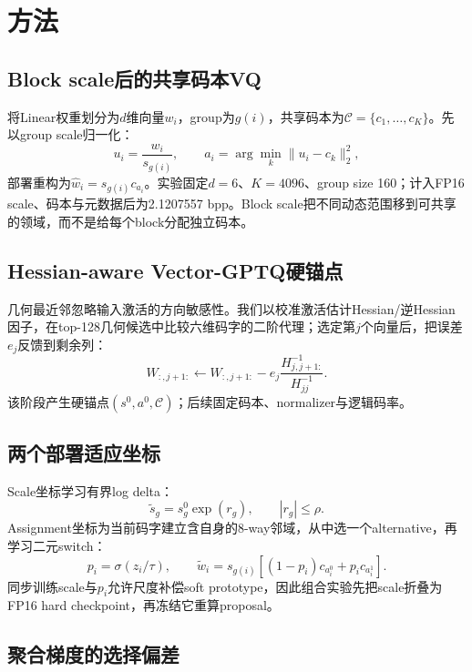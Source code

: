 \section{方法}

\subsection{Block scale后的共享码本VQ}

将Linear权重划分为$d$维向量$w_i$，group为$g(i)$，共享码本为$\mathcal C=\{c_1,\ldots,c_K\}$。先以group scale归一化：
\begin{equation}
u_i=\frac{w_i}{s_{g(i)}},\qquad a_i=\arg\min_k\|u_i-c_k\|_2^2,
\end{equation}
部署重构为$\hat w_i=s_{g(i)}c_{a_i}$。实验固定$d=6$、$K=4096$、group size 160；计入FP16 scale、码本与元数据后为2.1207557 bpp。Block scale把不同动态范围移到可共享的领域，而不是给每个block分配独立码本。

\subsection{Hessian-aware Vector-GPTQ硬锚点}

几何最近邻忽略输入激活的方向敏感性。我们以校准激活估计Hessian/逆Hessian因子，在top-128几何候选中比较六维码字的二阶代理；选定第$j$个向量后，把误差$e_j$反馈到剩余列：
\begin{equation}
W_{:,j+1:}\leftarrow W_{:,j+1:}-e_j\frac{H^{-1}_{j,j+1:}}{H^{-1}_{jj}}.
\end{equation}
该阶段产生硬锚点$(s^0,a^0,\mathcal C)$；后续固定码本、normalizer与逻辑码率。

\subsection{两个部署适应坐标}

Scale坐标学习有界log delta：
\begin{equation}
\tilde s_g=s_g^0\exp(r_g),\qquad |r_g|\le\rho.
\end{equation}
Assignment坐标为当前码字建立含自身的8-way邻域，从中选一个alternative，再学习二元switch：
\begin{equation}
p_i=\sigma(z_i/\tau),\qquad
\tilde w_i=s_{g(i)}[(1-p_i)c_{a_i^0}+p_ic_{a_i^1}].
\end{equation}
同步训练scale与$p_i$允许尺度补偿soft prototype，因此组合实验先把scale折叠为FP16 hard checkpoint，再冻结它重算proposal。

\subsection{聚合梯度的选择偏差}

